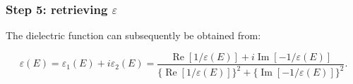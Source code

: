 \subsubsection{Step 5: retrieving $\varepsilon$}
The dielectric function  can subsequently be obtained from:

\begin{equation}
    \varepsilon(E)=\varepsilon_{1}(E)+i \varepsilon_{2}(E)=\frac{\operatorname{Re}[1 / \varepsilon(E)]+i \operatorname{Im}[-1 / \varepsilon(E)]}{\{\operatorname{Re}[1 / \varepsilon(E)]\}^{2}+\{\operatorname{Im}[-1 / \varepsilon(E)]\}^{2}}.
\end{equation}

